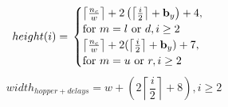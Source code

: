 \begin{align}\label{eq:1}
height(i)=
\newline\newline
\begin{cases}
\left \lceil{   \frac{n_c}{w}}\right \rceil+2\left(\left \lceil{\frac{i}{2}}\right \rceil+\mathbf{b}_y\right)+4,&\\ 
\text{for } m = l \text{ or } d, i \geq 2&\\
\left \lceil{   \frac{n_c}{w}}\right \rceil+2(\left \lceil{\frac{i}{2}}\right \rceil+\mathbf{b}_y)+7,&\\ 
\text{for } m = u \text{ or } r, i \geq 2&\\
\end{cases}
\end{align}
\begin{equation}\label{eq:2}
width_{hopper+delays}=w+(2\left \lceil{ \frac{i}{2}}\right \rceil+8),  i \geq 2
\end{equation}
